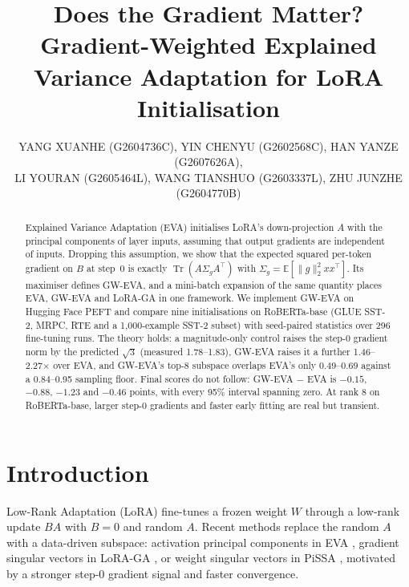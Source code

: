 \documentclass[letterpaper]{article} %
\title{Does the Gradient Matter? Gradient-Weighted Explained Variance Adaptation for LoRA Initialisation}
\author{
    {YANG XUANHE} (G2604736C),
    {YIN CHENYU} (G2602568C),
    {HAN YANZE} (G2607626A),\\
    {LI YOURAN} (G2605464L),
    {WANG TIANSHUO} (G2603337L),
    {ZHU JUNZHE} (G2604770B)
}
\newcommand{\E}{\mathbb{E}}
\newcommand{\Sg}{\Sigma_g}
\newcommand{\norm}[1]{\lVert #1\rVert}
\newcommand{\Tr}{\operatorname{Tr}}
\begin{document}
\maketitle

\begin{abstract}
Explained Variance Adaptation (EVA) initialises LoRA's down-projection $A$ with the principal components of layer inputs, assuming that output gradients are independent of inputs. Dropping this assumption, we show that the expected squared per-token gradient on $B$ at step~0 is exactly $\Tr(A\Sg A^\top)$ with $\Sg=\E[\norm{g}_2^2xx^\top]$. Its maximiser defines GW-EVA, and a mini-batch expansion of the same quantity places EVA, GW-EVA and LoRA-GA in one framework. We implement GW-EVA on Hugging Face PEFT and compare nine initialisations on RoBERTa-base (GLUE SST-2, MRPC, RTE and a 1,000-example SST-2 subset) with seed-paired statistics over 296 fine-tuning runs. The theory holds: a magnitude-only control raises the step-0 gradient norm by the predicted $\sqrt{3}$ (measured 1.78--1.83), GW-EVA raises it a further 1.46--2.27$\times$ over EVA, and GW-EVA's top-8 subspace overlaps EVA's only 0.49--0.69 against a 0.84--0.95 sampling floor. Final scores do not follow: GW-EVA $-$ EVA is $-0.15$, $-0.88$, $-1.23$ and $-0.46$ points, with every 95\% interval spanning zero. At rank 8 on RoBERTa-base, larger step-0 gradients and faster early fitting are real but transient.
\end{abstract}

\section{Introduction}

Low-Rank Adaptation (LoRA) \citep{hu2022lora} fine-tunes a frozen weight $W$ through a low-rank update $BA$ with $B=0$ and random $A$. Recent methods replace the random $A$ with a data-driven subspace: activation principal components in EVA \citep{paischer2025eva}, gradient singular vectors in LoRA-GA \citep{wang2024loraga}, or weight singular vectors in PiSSA \citep{meng2024pissa}, motivated by a stronger step-0 gradient signal and faster convergence.
\end{document}
